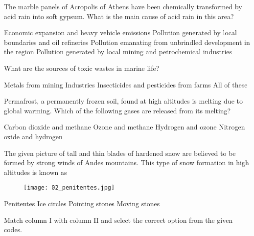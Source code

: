 \begin{questions}
    \question The marble panels of Acropolis of Athens have been chemically transformed by acid rain into soft gypsum. What is the main cause of acid rain in this area?

    \begin{randomizechoices}
        \CorrectChoice Economic expansion and heavy vehicle emissions
        \choice Pollution generated by local boundaries and oil refineries
        \choice Pollution emanating from unbrindled development in the region
        \choice Pollution generated by local mining and petrochemical industries
    \end{randomizechoices}

    \question What are the sources of toxic wastes in marine life?

    \begin{choices}
        \choice Metals from mining
        \choice Industries
        \choice Insecticides and pesticides from farms
        \CorrectChoice All of these
    \end{choices}

    \question Permafrost, a permanently frozen soil, found at high altitudes is melting due to global warming. Which of the following gases are released from its melting?

    \begin{randomizeoneparchoices}
        \CorrectChoice Carbon dioxide and methane
        \choice Ozone and methane
        \choice Hydrogen and ozone
        \choice Nitrogen oxide and hydrogen
    \end{randomizeoneparchoices}

    \question The given picture of tall and thin blades of hardened snow are believed to be formed by strong winds of Andes mountains. This type of snow formation in high altitudes is known as \fillin

    \begin{figure}[h!]
        \centering
        \texttt{[image: 02\_penitentes.jpg]}
      \end{figure}

    \begin{randomizeoneparchoices}
        \CorrectChoice Penitentes
        \choice Ice circles
        \choice Pointing stones
        \choice Moving stones
    \end{randomizeoneparchoices}

    \question Match column I with column II and select the correct option from the given codes.


\end{questions}
